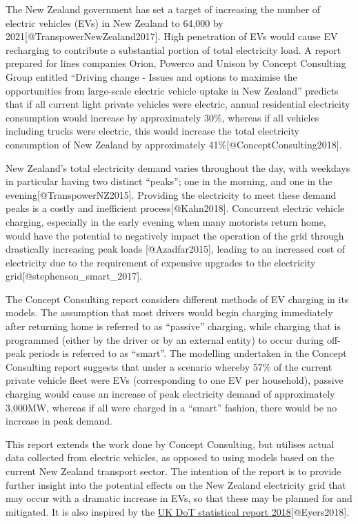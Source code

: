 \documentclass[]{article}
\begin{document}
The New Zealand government has set a target of increasing the number of
electric vehicles (EVs) in New Zealand to 64,000 by
2021{[}@TranspowerNewZealand2017{]}. High penetration of EVs would cause
EV recharging to contribute a substantial portion of total electricity
load. A report prepared for lines companies Orion, Powerco and Unison by
Concept Consulting Group entitled ``Driving change - Issues and options
to maximise the opportunities from large-scale electric vehicle uptake
in New Zealand'' predicts that if all current light private vehicles
were electric, annual residential electricity consumption would increase
by approximately 30\%, whereas if all vehicles including trucks were
electric, this would increase the total electricity consumption of New
Zealand by approximately 41\%{[}@ConceptConsulting2018{]}.

New Zealand's total electricity demand varies throughout the day, with
weekdays in particular having two distinct ``peaks''; one in the
morning, and one in the evening{[}@TranspowerNZ2015{]}. Providing the
electricity to meet these demand peaks is a costly and inefficient
process{[}@Kahn2018{]}. Concurrent electric vehicle charging, especially
in the early evening when many motorists return home, would have the
potential to negatively impact the operation of the grid through
drastically increasing peak loads {[}@Azadfar2015{]}, leading to an
increased cost of electricity due to the requirement of expensive
upgrades to the electricity grid{[}@stephenson\_smart\_2017{]}.

The Concept Consulting report considers different methods of EV charging
in its models. The assumption that most drivers would begin charging
immediately after returning home is referred to as ``passive'' charging,
while charging that is programmed (either by the driver or by an
external entity) to occur during off-peak periods is referred to as
``smart''. The modelling undertaken in the Concept Consulting report
suggests that under a scenario whereby 57\% of the current private
vehicle fleet were EVs (corresponding to one EV per household), passive
charging would cause an increase of peak electricity demand of
approximately 3,000MW, whereas if all were charged in a ``smart''
fashion, there would be no increase in peak demand.

This report extends the work done by Concept Consulting, but utilises
actual data collected from electric vehicles, as opposed to using models
based on the current New Zealand transport sector. The intention of the
report is to provide further insight into the potential effects on the
New Zealand electricity grid that may occur with a dramatic increase in
EVs, so that these may be planned for and mitigated. It is also inspired
by the
\href{https://assets.publishing.service.gov.uk/government/uploads/system/uploads/attachment_data/file/764270/electric-chargepoint-analysis-2017-domestics.pdf}{UK
DoT statistical report 2018}{[}@Eyers2018{]}.
\end{document}
